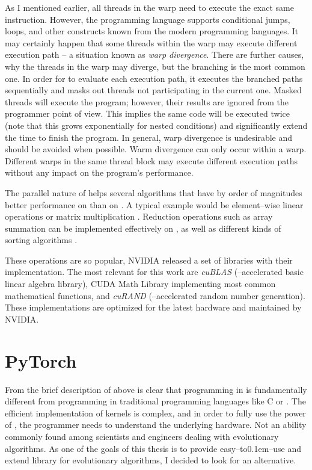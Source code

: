As I mentioned earlier, all threads in the warp need to execute the exact same instruction. However, the programming language supports conditional jumps, loops, and other constructs known from the modern programming languages. It may certainly happen that some threads within the warp may execute different execution path -- a situation known as \emph{warp divergence}. There are further causes, why the threads in the warp may diverge, but the branching is the most common one. In order for \gpu to evaluate each execution path, it executes the branched paths sequentially and masks out threads not participating in the current one. Masked threads will execute the program; however, their results are ignored from the programmer point of view. This implies the same code will be executed twice (note that this grows exponentially for nested conditions) and significantly extend the time to finish the program. In general, warp divergence is undesirable and should be avoided when possible.
Warm divergence can only occur within a warp. Different warps in the same thread block may execute different execution paths without any impact on the program's performance.

The parallel nature of \cuda helps several algorithms that have by order of magnitudes better performance on \gpu than on \cpuns. A typical example would be element--wise linear operations or matrix multiplication \citep{GPUMatrixMultiplication}. Reduction operations such as array summation can be implemented effectively on \gpu \citep{harris2007optimizing}, as well as different kinds of sorting algorithms \citep{GPUsorting}.

These operations are so popular, NVIDIA released a set of libraries with their implementation. The most relevant for this work are \textit{cuBLAS} (\gpuns--accelerated basic linear algebra library), CUDA Math Library implementing most common mathematical functions, and \textit{cuRAND} (\cpuns--accelerated random number generation). These implementations are optimized for the latest hardware and maintained by NVIDIA.




\section{PyTorch}

From the brief description of \cuda above is clear that programming in \cuda is fundamentally different from programming in traditional programming languages like C or \cppns. The efficient implementation of kernels is complex, and in order to fully use the power of \gpuns, the programmer needs to understand the underlying hardware. Not an ability commonly found among scientists and engineers dealing with evolutionary algorithms. As one of the goals of this thesis is to provide easy--to\kern0.1em--use and extend library for evolutionary algorithms, I decided to look for an alternative.

